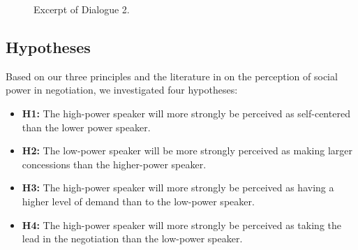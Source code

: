 \documentclass{llncs}
\begin{document}
		
		\begin{figure}
				
				\caption{\label{fig:ex-dialogue}Excerpt of Dialogue 2.}
			\end{figure}
			\vspace{-1em} 
			\subsection{Hypotheses}
			\vspace{-.5em} 
			Based on our three principles and the literature in on the perception of social power in negotiation, we investigated four hypotheses:
			\vspace{-.5em} 
			\begin{itemize}
				\item  \textbf{H1:} The high-power speaker will more strongly be perceived as self-centered than the lower power speaker.  
				
				\item \textbf{H2:} The low-power speaker will be more strongly perceived as making larger concessions than the higher-power speaker.
				
				\item \textbf{H3:}  The high-power speaker will more strongly be perceived as having a higher level of demand than to the low-power speaker.
				
				\item \textbf{H4:}  The high-power speaker will more strongly be perceived as taking the lead in the negotiation than the low-power speaker.
				
			\end{itemize}
			
\end{document}
